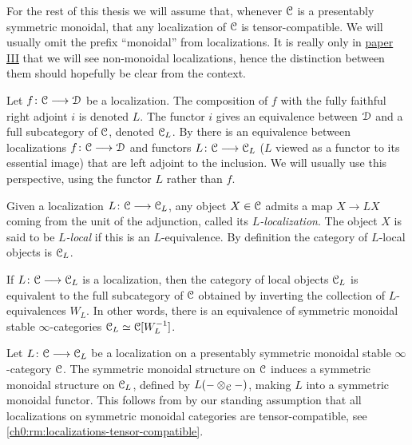 \begin{remark}
    \label{ch0:rm:localizations-tensor-compatible}
    For the rest of this thesis we will assume that, whenever $\EuScript{C}$ is a presentably symmetric monoidal, that any localization of $\EuScript{C}$ is tensor-compatible. We will usually omit the prefix ``monoidal'' from localizations. It is really only in \hyperref[ch3]{paper III} that we will see non-monoidal localizations, hence the distinction between them should hopefully be clear from the context.
\end{remark}

\begin{remark}
    Let $f\colon \EuScript{C}\longrightarrow \EuScript{D}$ be a localization. The composition of $f$ with the fully faithful right adjoint $i$ is denoted $L$. The functor $i$ gives an equivalence between $\EuScript{D}$ and a full subcategory of $\EuScript{C}$, denoted $\EuScript{C}_L$. By \cite[5.2.7.4]{lurie_09} there is an equivalence between localizations $f\colon \EuScript{C}\longrightarrow \EuScript{D}$ and functors $L\colon \EuScript{C}\longrightarrow \EuScript{C}_L$ ($L$ viewed as a functor to its essential image) that are left adjoint to the inclusion. We will usually use this perspective, using the functor $L$ rather than $f$. 
\end{remark}

\begin{definition}
    Given a localization $L\colon \EuScript{C}\longrightarrow \EuScript{C}_L$, any object $X\in \EuScript{C}$ admits a map $X\longrightarrow LX$ coming from the unit of the adjunction, called its \emph{$L$-localization}. The object $X$ is said to be \emph{$L$-local} if this is an $L$-equivalence. By definition the category of $L$-local objects is $\EuScript{C}_L$. 
\end{definition}

\begin{proposition}
    If $L\colon \EuScript{C}\longrightarrow \EuScript{C}_L$ is a localization, then the category of local objects $\EuScript{C}_L$ is equivalent to the full subcategory of $\EuScript{C}$ obtained by inverting the collection of $L$-equivalences $W_L$. In other words, there is an equivalence of symmetric monoidal stable $\infty$-categories $\EuScript{C}_L\simeq \EuScript{C}[W_L^{-1}]$.
\end{proposition}

\begin{remark}
    \label{ch0:rm:monoidal-localization}
    Let $L\colon \EuScript{C}\longrightarrow \EuScript{C}_L$ be a localization on a presentably symmetric monoidal stable $\infty$-category $\EuScript{C}$. The symmetric monoidal structure on $\EuScript{C}$ induces a symmetric monoidal structure on $\EuScript{C}_L$, defined by $L(-\otimes_{\EuScript{C}} -)$, making $L$ into a symmetric monoidal functor. This follows from \cite[2.2.1.9]{Lurie_HA} by our standing assumption that all localizations on symmetric monoidal categories are tensor-compatible, see \cref{ch0:rm:localizations-tensor-compatible}. 
\end{remark}

